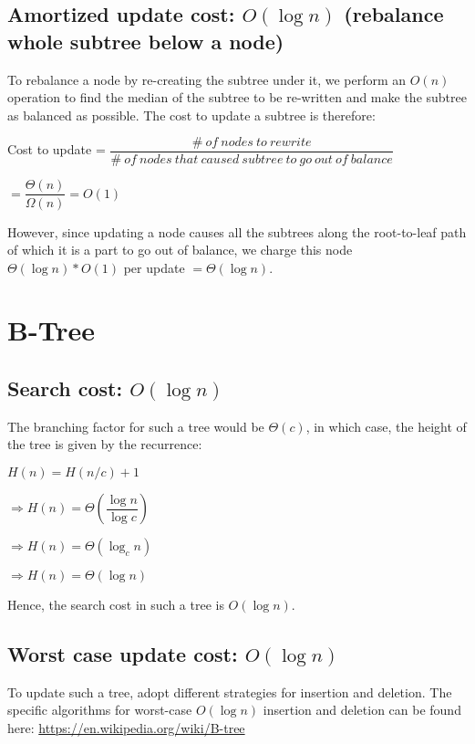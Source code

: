 \documentclass{article}
\begin{document}
\subsection{Amortized update cost: $O(\log{n})$ (rebalance whole subtree below a node)}

To rebalance a node by re-creating the subtree under it, we perform an
$O(n)$ operation to find the median of the subtree to be re-written
and make the subtree as balanced as possible. The cost to update a
subtree is therefore:

Cost to update =
$\dfrac{\#\ of\ nodes\ to\ rewrite}{\#\ of\ nodes\ that\ caused\ subtree\ to\ go\ out\ of\ balance}$

$=\dfrac{\Theta(n)}{\Omega(n)} = O(1)$

However, since updating a node causes all the subtrees along the
root-to-leaf path of which it is a part to go out of balance, we
charge this node $\Theta(\log{n}) * O(1)$ per update
$=\Theta(\log{n})$.

\clearpage

\section{B-Tree}

\subsection{Search cost: $O(\log{n})$}

The branching factor for such a tree would be $\Theta(c)$, in which
case, the height of the tree is given by the recurrence:

$H(n) = H(n/c) + 1$

$\Rightarrow H(n) = \Theta\left(\dfrac{\log{n}}{\log{c}}\right)$

$\Rightarrow H(n) = \Theta(\log_c{n})$

$\Rightarrow H(n) = \Theta(\log{n})$

Hence, the search cost in such a tree is $O(\log{n})$.

\subsection{Worst case update cost: $O(\log{n})$}

To update such a tree, adopt different strategies for insertion and
deletion. The specific algorithms for worst-case $O(\log{n})$
insertion and deletion can be found here:
\url{https://en.wikipedia.org/wiki/B-tree}
\end{document}
